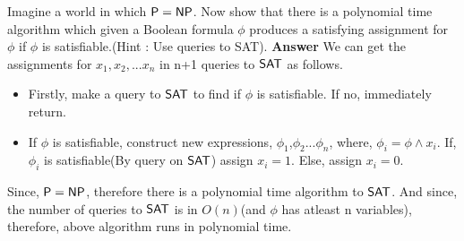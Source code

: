 \documentclass[addpoints,12pt]{exam}
\begin{document}
\begin{questions}
\question[7] 
Imagine a world in which ${\mathsf{P}} = {\mathsf{NP}}$. Now show that there is a
polynomial time algorithm which given a Boolean formula $\phi$ produces a satisfying assignment for $\phi$ if $\phi$ is satisfiable.(Hint : Use queries to SAT).
\newline
\textbf{Answer}\newline
We can get the assignments for $x_{1},x_{2},...x_{n}$ in n+1 queries to ${\mathsf{SAT}}$ as follows.
\begin{itemize}
 \item Firstly, make a query to ${\mathsf{SAT}}$ to find if $\phi$ is satisfiable. If no, immediately return.
 \item If $\phi$ is satisfiable, construct new expressions, $\phi_{1}$,$\phi_{2}$...$\phi_{n}$, where,
    $\phi_{i}=\phi \wedge x_{i}$.\newline
    If, $\phi_{i}$ is satisfiable(By query on ${\mathsf{SAT}}$) assign $x_{i}=1$. Else, assign $x_{i}=0$.
\end{itemize}

Since, ${\mathsf{P}} = {\mathsf{NP}}$, therefore there is a polynomial time algorithm to ${\mathsf{SAT}}$. And since, the number of queries to ${\mathsf{SAT}}$ is in $O(n)$(and $\phi$ has atleast n variables), therefore,
above algorithm runs in polynomial time.



\end{questions}
\end{document}

